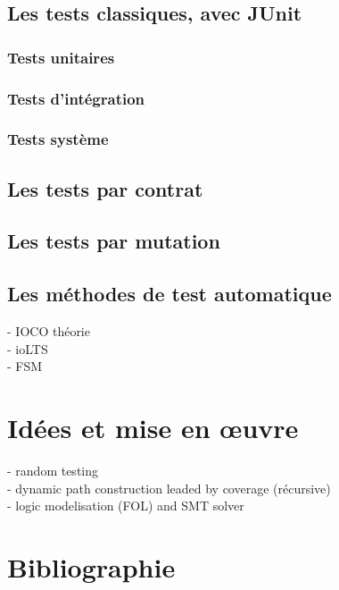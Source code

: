 \documentclass[a4paper]{report}
\begin{document}
\section*{Les tests classiques, avec JUnit}
\subsection*{Tests unitaires}
\subsection*{Tests d'intégration}
\subsection*{Tests système}
\section*{Les tests par contrat}
\section*{Les tests par mutation}

\section*{Les méthodes de test automatique}
- IOCO théorie\\
- ioLTS\\
- FSM\\




\chapter*{Idées et mise en œuvre}
- random testing\\
- dynamic path construction leaded by coverage (récursive)\\
- logic modelisation (FOL) and SMT solver\\

\chapter*{Bibliographie}
\end{document}
